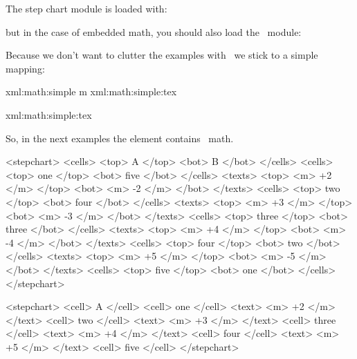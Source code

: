 \typebuffer \startlinecorrection \getbuffer \getbuffer[table] \stoplinecorrection

\startbuffer
\setupSTEPlines
  [alternative=8]
\stopbuffer

\typebuffer \startlinecorrection \getbuffer \getbuffer[table] \stoplinecorrection

\stopsection

\startsection[title=Usage]

The step chart module is loaded with:

\starttyping
\usemodule[cell] %
\stoptyping

\noindentation but in the case of embedded math, you should also load the \MATHML\ module:

\starttyping
{}
\stoptyping

\stopsection

\startsection[title=\XML\ example]

Because we don't want to clutter the examples with \MATHML\ we stick to a simple
mapping:

\startbuffer
\startxmlsetups xml:math:simple
     {m} {xml:math:simple:tex}
\stopxmlsetups

\startxmlsetups xml:math:simple:tex
\stopxmlsetups

\stopbuffer

\typebuffer \getbuffer

So, in the next examples the  element contains \TEX\ math.

\startbuffer
<stepchart>
  <cells> <top> A           </top> <bot> B           </bot> </cells>
  <cells> <top> one         </top> <bot> five        </bot> </cells>
  <texts> <top> <m> +2 </m> </top> <bot> <m> -2 </m> </bot> </texts>
  <cells> <top> two         </top> <bot> four        </bot> </cells>
  <texts> <top> <m> +3 </m> </top> <bot> <m> -3 </m> </bot> </texts>
  <cells> <top> three       </top> <bot> three       </bot> </cells>
  <texts> <top> <m> +4 </m> </top> <bot> <m> -4 </m> </bot> </texts>
  <cells> <top> four        </top> <bot> two         </bot> </cells>
  <texts> <top> <m> +5 </m> </top> <bot> <m> -5 </m> </bot> </texts>
  <cells> <top> five        </top> <bot> one         </bot> </cells>
</stepchart>
\stopbuffer

\typebuffer \processxmlbuffer

\startbuffer
<stepchart>
  <cell> A     </cell>
  <cell> one   </cell> <text> <m> +2 </m> </text>
  <cell> two   </cell> <text> <m> +3 </m> </text>
  <cell> three </cell> <text> <m> +4 </m> </text>
  <cell> four  </cell> <text> <m> +5 </m> </text>
  <cell> five  </cell>
</stepchart>
\stopbuffer

